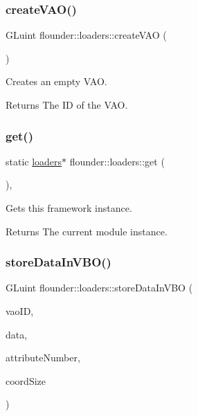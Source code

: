 \subsubsection{\texorpdfstring{create\+V\+A\+O()}{createVAO()}}
{\footnotesize\ttfamily G\+Luint flounder\+::loaders\+::create\+V\+AO (\begin{DoxyParamCaption}{ }\end{DoxyParamCaption})}



Creates an empty V\+AO. 

\begin{DoxyReturn}{Returns}
The ID of the V\+AO. 
\end{DoxyReturn}
\mbox{\label{classflounder_1_1loaders_ac57855261d2d43c545cac42e9efe981a}} 
\subsubsection{\texorpdfstring{get()}{get()}}
{\footnotesize\ttfamily static \hyperlink{classflounder_1_1loaders}{loaders}$\ast$ flounder\+::loaders\+::get (\begin{DoxyParamCaption}{ }\end{DoxyParamCaption})\hspace{0.3cm}{\ttfamily [inline]}, {\ttfamily [static]}}



Gets this framework instance. 

\begin{DoxyReturn}{Returns}
The current module instance. 
\end{DoxyReturn}
\mbox{\label{classflounder_1_1loaders_a035a42c2f558c1f126cc54729388fca3}} 
\subsubsection{\texorpdfstring{store\+Data\+In\+V\+B\+O()}{storeDataInVBO()}}
{\footnotesize\ttfamily G\+Luint flounder\+::loaders\+::store\+Data\+In\+V\+BO (\begin{DoxyParamCaption}\item[{G\+Luint \&}]{vao\+ID,  }\item[{const std\+::vector$<$ G\+Lfloat $>$ \&}]{data,  }\item[{const int \&}]{attribute\+Number,  }\item[{const int \&}]{coord\+Size }\end{DoxyParamCaption})}



